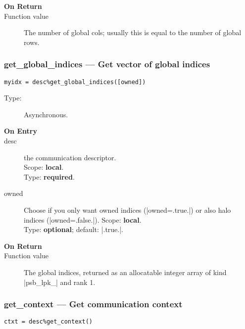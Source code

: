 \begin{description}
\item[\bf On Return]
\item[Function value] The number of global cols; usually this is equal
  to the number of global rows. 
\end{description}


\subsubsection{get\_global\_indices --- Get vector of global indices}

\begin{verbatim}
myidx = desc%get_global_indices([owned])
\end{verbatim}

\begin{description}
\item[Type:] Asynchronous.
\item[\bf On Entry]
\item[desc] the communication descriptor.\\
Scope: {\bf local}.\\
Type: {\bf required}.\\
\item[owned] Choose if you only want owned indices
  (\fortinline|owned=.true.|) or also halo indices (\fortinline|owned=.false.|). 
Scope: {\bf local}.\\
Type: {\bf optional}; default: \fortinline|.true.|.\\
\end{description}

\begin{description}
\item[\bf On Return]
\item[Function value] The global indices, returned as an allocatable
  integer array of kind \fortinline|psb_lpk_|  and rank 1. 
\end{description}



\subsubsection{get\_context --- Get communication context}

\begin{verbatim}
ctxt = desc%get_context()
\end{verbatim}

